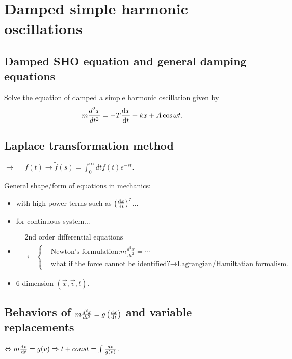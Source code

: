 \chapter{Damped simple harmonic oscillations}\label{chap:dampledosc}
\section{Damped SHO equation and general damping equations}
Solve the equation of damped a simple harmonic oscillation given by
\begin{equation}
m\frac{d^2 x}{dt^2}=-T\frac{{\mathrm d} {x}}{{\mathrm d}t}-kx+A \cos\omega t.
\end{equation}

\section{Laplace transformation method}\label {Sec:Laplace}
$\rightarrow\quad$ $f(t) \rightarrow \tilde{f}(s)=\int_0^\infty dt f(t) e^{-st}$.

General shape/form of equations in mechanics:
\begin{itemize}
\item with high power terms such as $\left( \frac{{\mathrm d} {x}}{{\mathrm d}t}\right)^7$...
\item for continuous system...
\item \begin{align*}
        &\text{2nd order differential equations} \\
        &\leftarrow
        \left\{
         \begin{array}{cl} &\text{Newton's formulation:} m \frac{d^2 x}{dt^2}=\cdots \\
            &\text{what if the force cannot be identified?} \rightarrow \text{Lagrangian/Hamiltatian formalism.}
         \end{array}
        \right.
        \end{align*}
\item  $6$-dimension $(\vec{x},\vec{v},t)$.
\end{itemize}

\section{Behaviors of $m \frac{d^2 x}{dt^2}=g\left(\frac{{\mathrm d} {x}}{{\mathrm d}t}\right)$ and variable replacements}\label{sec:vreplace}

$\Leftrightarrow m\frac{{\mathrm d} {v}}{{\mathrm d}t}=g(v) \Rightarrow t+const=\int\frac{dv}{g(v)}$.

